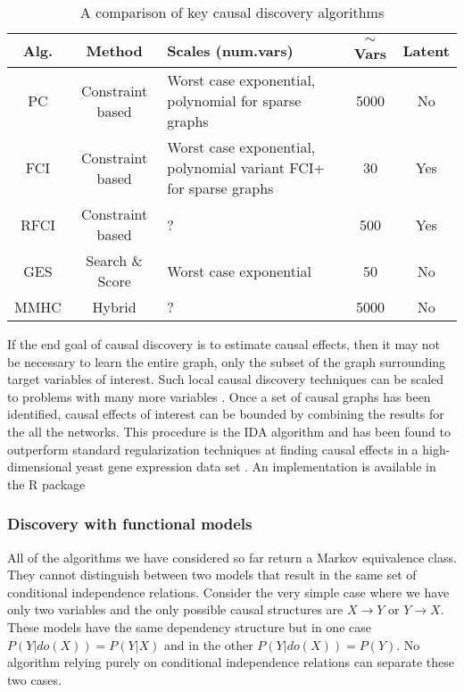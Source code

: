 \documentclass[11pt,a4paper]{article}
\begin{document}
\begin{table}[h]
\centering
\caption{A comparison of key causal discovery algorithms}
\label{table:discovery_algorithms}
\renewcommand{\arraystretch}{1.5}
\begin{tabular}{| c | c | p{4cm} | c | c |}
\hline
  \textbf {Alg.} &\textbf{ Method }& \textbf{Scales (num.vars) }& $\sim $ \textbf {Vars} & \textbf {Latent }  \\
  \hline
  PC & Constraint based & Worst case exponential, polynomial for sparse graphs & 5000 & No  \\ 
  \hline
  FCI & Constraint based & Worst case exponential, polynomial variant FCI+ for sparse graphs & 30 & Yes\\
  \hline
  RFCI & Constraint based & ? & 500 & Yes  \\
  \hline
  GES & Search \& Score  & Worst case exponential & 50 & No  \\
  \hline
  MMHC & Hybrid & ? & 5000 & No  \\
 \hline
\end{tabular}
\end{table}

 

If the end goal of causal discovery is to estimate causal effects, then it may not be necessary to learn the entire graph, only the subset of the graph surrounding target variables of interest. Such local causal discovery techniques can be scaled to problems with many more variables \cite{}. Once a set of causal graphs has been identified, causal effects of interest can be bounded by combining the results for the all the networks. This procedure is the IDA algorithm \cite{Maathuis2009} and has been found to outperform standard regularization techniques at finding causal effects in a high-dimensional yeast gene expression data set \cite{Maathuis2010}. An implementation is available in the R package \cite{Kalisch2012}

\subsubsection{Discovery with functional models}
All of the algorithms we have considered so far return a Markov equivalence class. They cannot distinguish between two models that result in the same set of conditional independence relations. Consider the very simple case where we have only two variables and the only possible causal structures are $X \rightarrow Y$ or $Y \rightarrow X$. These models have the same dependency structure but in one case $P(Y|do(X)) = P(Y|X)$ and in the other $P(Y|do(X)) = P(Y)$. No algorithm relying purely on conditional independence relations can separate these two cases.
\end{document}
